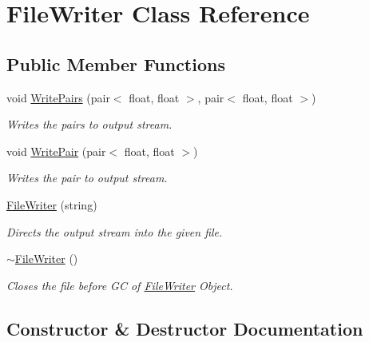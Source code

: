 \hypertarget{classFileWriter}{}\section{File\+Writer Class Reference}
\label{classFileWriter}
\subsection*{Public Member Functions}
\begin{DoxyCompactItemize}
\item 
void \hyperlink{classFileWriter_afe122f1d6ab2085a2df3bff1eda1c300}{Write\+Pairs} (pair$<$ float, float $>$, pair$<$ float, float $>$)
\begin{DoxyCompactList}\small\item\em Writes the pairs to output stream. \end{DoxyCompactList}\item 
void \hyperlink{classFileWriter_a383f29a30951f0cba784416a679df6f6}{Write\+Pair} (pair$<$ float, float $>$)
\begin{DoxyCompactList}\small\item\em Writes the pair to output stream. \end{DoxyCompactList}\item 
\hyperlink{classFileWriter_a95069a2543d48d800d84bb922b907dfb}{File\+Writer} (string)
\begin{DoxyCompactList}\small\item\em Directs the output stream into the given file. \end{DoxyCompactList}\item 
\mbox{\label{classFileWriter_ae5490307dcaf9237f4c1b8b8df433e03}} 
\hyperlink{classFileWriter_ae5490307dcaf9237f4c1b8b8df433e03}{$\sim$\+File\+Writer} ()
\begin{DoxyCompactList}\small\item\em Closes the file before GC of \hyperlink{classFileWriter}{File\+Writer} Object. \end{DoxyCompactList}\end{DoxyCompactItemize}


\subsection{Constructor \& Destructor Documentation}
\mbox{\label{classFileWriter_a95069a2543d48d800d84bb922b907dfb}} 
